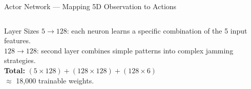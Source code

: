 \documentclass[10pt, aspectratio=169]{beamer}
\begin{document}
\begin{frame}{Actor Network --- Mapping 5D Observation to Actions}
\begin{columns}[T,onlytextwidth]
\begin{block}{Layer Sizes}
  \footnotesize
  $5 \to 128$: each neuron learns a specific combination of the 5 input features.\\[3pt]
  $128 \to 128$: second layer combines simple patterns into complex jamming strategies.\\[3pt]
  \textbf{Total:} $(5 \times 128) + (128 \times 128) + (128 \times 6)$\\
  $\approx$ \alert{18{,}000} trainable weights.
\end{block}
\end{columns}

\vspace{0.2cm}
\begin{center}
\end{center}
\end{frame}
\end{document}
